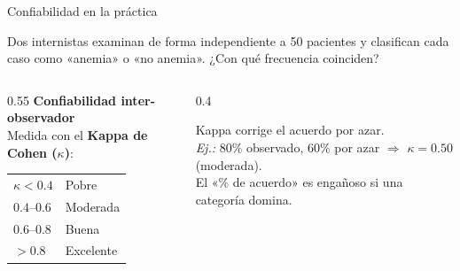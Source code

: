 \documentclass[aspectratio=169, 12pt, xcolor=table]{beamer}
\begin{document}
\begin{frame}{Confiabilidad en la práctica}
  \begin{caso}
    Dos internistas examinan de forma independiente a 50 pacientes y
    clasifican cada caso como «anemia» o «no anemia».
    ¿Con qué frecuencia coinciden?
  \end{caso}
  \vspace{-2pt}
  \begin{columns}[T]
    \begin{column}{0.55\textwidth}
      \textbf{Confiabilidad inter-observador}\\[0pt]
      Medida con el \textbf{Kappa de Cohen ($\kappa$)}:\\[0pt]
      \begin{tabular}{ll}
        $\kappa < 0.4$ & Pobre \\
        $0.4$--$0.6$   & Moderada \\
        $0.6$--$0.8$   & Buena \\
        $> 0.8$        & Excelente \\
      \end{tabular}
    \end{column}
    \begin{column}{0.4\textwidth}
      \begin{nota}
        Kappa corrige el acuerdo por azar.\\
        \textit{Ej.:} 80\% observado, 60\% por azar
        $\Rightarrow$ $\kappa = 0.50$ (moderada).\\
        El «\% de acuerdo» es engañoso si una categoría domina.
      \end{nota}
    \end{column}
  \end{columns}
\end{frame}
\end{document}
